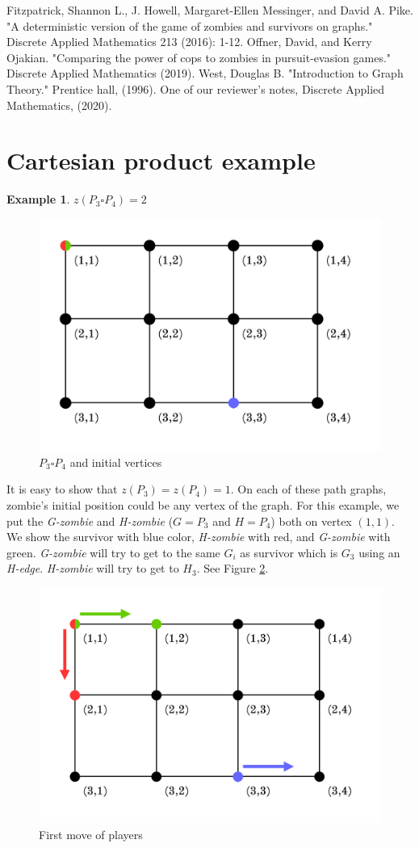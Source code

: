 \documentclass[1p]{elsarticle}
\newtheorem{example}[theorem]{Example}
\begin{document}
\begin{thebibliography}{999}
	
	Fitzpatrick, Shannon L., J. Howell, Margaret-Ellen Messinger, and David A. Pike. "A deterministic version of the
	game of zombies and survivors on graphs." Discrete Applied Mathematics 213 (2016): 1-12.
	Offner, David, and Kerry Ojakian. "Comparing the power of cops to zombies in pursuit-evasion games." Discrete
	Applied Mathematics (2019).
	West, Douglas B. "Introduction to Graph Theory." Prentice hall, (1996).
	One of our reviewer's notes, Discrete Applied Mathematics, (2020).
\end{thebibliography}

\newpage
\appendix
\section{Cartesian product example} \label{cartesianProductExample}
\begin{example} $z(P_3 \square P_4 ) = 2$
\end{example}

\begin{figure}[h!]
	\centering
	\includegraphics[width=0.5\linewidth]{fig/p34m1.png}
	\caption{$P_3 \square P_4$ and initial vertices}
	\label{fig:p3}
\end{figure}

It is easy to show that $z(P_3) = z(P_4) = 1$. On each of these path graphs, zombie's initial position could be any
vertex of the graph. For this example, we put the {\it G-zombie} and {\it H-zombie} ($G = P_3$ and $H = P_4$) both on
vertex $(1,1)$. We show the survivor with blue color, {\it H-zombie} with red, and {\it G-zombie} with green. {\it
G-zombie} will try to get to the same $G_{i}$ as survivor which is $G_3$ using an {\it H-edge}. {\it H-zombie} will try
to get to $H_3$. See Figure \ref{fig:p4}.

\begin{figure}[h!]
	\centering
	\includegraphics[width=0.5\linewidth]{fig/p34m2.png}
	\caption{First move of players}
	\label{fig:p4}
\end{figure}
\end{document}
